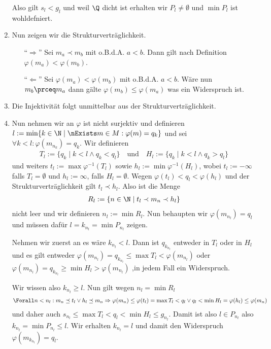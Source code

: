 \begin{solution}
\begin{enumerate}
        Also gilt $s_l < g_l$ und weil $\Q$ dicht ist erhalten wir $P_l \neq \emptyset$ und $\min P_l$ ist wohldefniert.
        \item Nun zeigen wir die Strukturverträglichkeit.
            \begin{enumerate}
                \item [``$\Rightarrow$''] Sei $m_a \prec m_b$ mit o.B.d.A. $a < b$. Dann gilt nach Definition $\varphi(m_a) < \varphi(m_b)$.
                \item [``$\Leftarrow$''] Sei $\varphi(m_a) < \varphi(m_b)$ mit o.B.d.A. $a < b$. Wäre nun $m_b \prceq m_a$ dann gälte $\varphi(m_b) \leq \varphi(m_a)$ was ein Widerspruch ist.
            \end{enumerate}
        \item Die Injektivität folgt unmittelbar aus der Strukturverträglichkeit.
        \item Nun nehmen wir an $\varphi$ ist nicht surjektiv und definieren $l := \min \{k \in \N \mid \nExists m \in M : \varphi(m) = q_k \}$ und sei $\forall k < l: \varphi(m_{n_k}) = q_k$. Wir definieren
        \begin{align*}
            T_l := \{q_k \mid k < l \land q_k < q_l\} \quad \textrm{und} \quad H_l := \{q_k \mid k < l \land q_k > q_l\}
        \end{align*}
        und weiters $t_l := \max \varphi^{-1}(T_l)$ sowie $h_l := \min \varphi^{-1}(H_l)$, wobei $t_l := -\infty$ falls $T_l = \emptyset$ und $h_l := \infty$, falls $H_l = \emptyset$. Wegen $\varphi(t_l) < q_l < \varphi(h_l)$ und der Strukturverträglichkeit gilt $t_l \prec h_l$. Also ist die Menge
        \begin{align*}
            R_l := \{n \in \N \mid t_l \prec m_n \prec h_l\}
        \end{align*}
        nicht leer und wir definieren $n_l := \min R_l$. Nun behaupten wir $\varphi(m_{n_l}) = q_l$ und müssen dafür $l = k_{n_l} = \min P_{n_l}$ zeigen.

        Nehmen wir zuerst an es wäre $k_{n_l} < l$. Dann ist $q_{k_n_l}$ entweder in $T_l$ oder in $H_l$ und es gilt entweder $\varphi(m_{n_l}) = q_{k_{n_l}}  \leq \max T_l < \varphi(m_{n_l})$ oder $\varphi(m_{n_l}) = q_{k_{n_l}} \geq \min H_l > \varphi(m_{n_l})$ ,in jedem Fall ein Widerspruch.

        Wir wissen also $k_{n_l} \geq l$. Nun gilt wegen $n_l = \min R_l$
        \begin{align*}
            \Forall n < n_l: m_n \preceq t_l \lor h_l \preceq m_n \Rightarrow \varphi(m_n) \leq \varphi(t_l) = \max T_l < q_l  \lor q_l < \min H_l = \varphi(h_l) \leq \varphi(m_n)
        \end{align*}
        und daher auch $s_{n_l} \leq \max T_l < q_l < \min H_l \leq g_{n_l}$. Damit ist also $l \in P_{n_l}$ also $k_{n_l} = \min P_{n_l} \leq l$. Wir erhalten $k_{n_l} = l$ und damit den Widerspruch $\varphi(m_{k_{n_l}}) = q_l$.
    \end{enumerate}
\end{solution}
